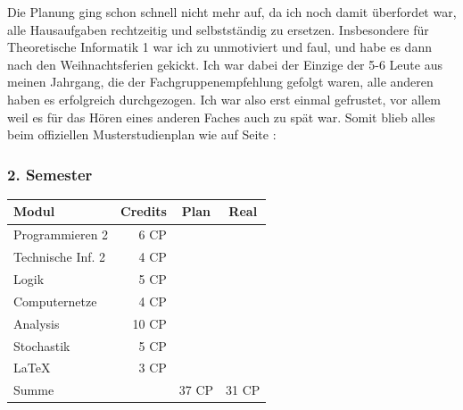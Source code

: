 Die Planung ging schon schnell nicht mehr auf, da ich noch damit
überfordet war, alle Hausaufgaben rechtzeitig und selbstständig zu
ersetzen. Insbesondere für Theoretische Informatik 1 war ich zu
unmotiviert und faul, und habe es dann nach den Weihnachtsferien
gekickt. Ich war dabei der Einzige der 5-6 Leute aus meinen Jahrgang,
die der Fachgruppenempfehlung gefolgt waren, alle anderen haben es
erfolgreich durchgezogen. Ich war also erst einmal gefrustet, vor
allem weil es für das Hören eines anderen Faches auch zu spät
war. Somit blieb alles beim offiziellen Musterstudienplan wie auf
Seite \pageref{musterstudienplan}:\\

\subsubsection*{2. Semester}
{
\footnotesize
\begin{tabular}{|l|r|c|c|}
\hline \textbf{Modul}		& \textbf{Credits} 	& \textbf{Plan} & \textbf{Real} \\ 
\hline
\hline Programmieren 2 		& 6 CP 				& \nx 			& 	 	\\ 
\hline Technische Inf. 2	& 4 CP 				& \nx 			& 	 	\\ 
\hline Logik 				& 5 CP 				& \nx 			& \nx 	\\ 
\hline Computernetze 		& 4 CP 				& \nx 			& \nx 	\\ 
\hline Analysis 			& 10 CP 			& \nx 			& \nx	\\ 
\hline Stochastik 			& 5 CP 				& \nx 			& \nx 	\\ 
\hline \LaTeX\ 				& 3 CP 				& \nx 			& \nx 	\\ 
\hline
\hline Summe 				&  					& 37 CP 		& 31 CP \\ 
\hline 
\end{tabular}
}

